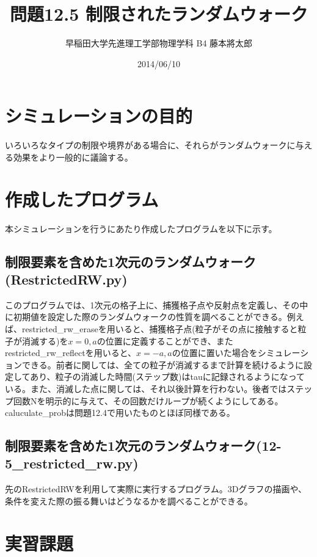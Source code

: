 \documentclass{jsarticle}
\title{問題12.5 制限されたランダムウォーク}
\author{早稲田大学先進理工学部物理学科 B4 藤本將太郎}
\date{2014/06/10}
\begin{document}
\maketitle

    \section{シミュレーションの目的}
        いろいろなタイプの制限や境界がある場合に、それらがランダムウォークに与える効果をより一般的に議論する。

    \section{作成したプログラム}
        本シミュレーションを行うにあたり作成したプログラムを以下に示す。

        \subsection{制限要素を含めた1次元のランダムウォーク(RestrictedRW.py)}
            このプログラムでは、1次元の格子上に、捕獲格子点や反射点を定義し、その中に初期値を設定した際のランダムウォークの性質を調べることができる。例えば、restricted\_rw\_eraseを用いると、捕獲格子点(粒子がその点に接触すると粒子が消滅する)を$x=0,a$の位置に定義することができ、またrestricted\_rw\_reflectを用いると、$x=-a,a$の位置に置いた場合をシミュレーションできる。前者に関しては、全ての粒子が消滅するまで計算を続けるように設定してあり、粒子の消滅した時間(ステップ数)はtauに記録されるようになっている。また、消滅した点に関しては、それ以後計算を行わない。後者ではステップ回数Nを明示的に与えて、その回数だけループが続くようにしてある。caluculate\_probは問題12.4で用いたものとほぼ同様である。


        \subsection{制限要素を含めた1次元のランダムウォーク(12-5\_restricted\_rw.py)}
            先のRestrictedRWを利用して実際に実行するプログラム。3Dグラフの描画や、条件を変えた際の振る舞いはどうなるかを調べることができる。


    \section{実習課題}
\end{document}
